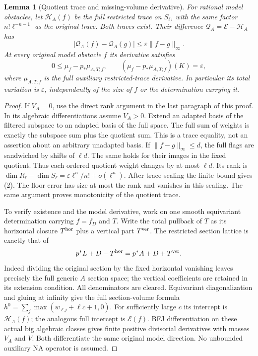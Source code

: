 \documentclass[11pt]{article}
\newtheorem{lemma}[theorem]{Lemma}
\begin{document}
\begin{lemma}[Quotient trace and missing-volume derivative]\label{quotient}
For rational model obstacles, let $\mathscr H_A(f)$ be the
full restricted trace on $S_\ell$, with the same factor
$n!\ell^{-n-1}$ as the original trace.
Both traces exist. Their difference
$\mathscr Q_A=\mathscr E-\mathscr H_A$ has
\[
 |\mathscr Q_A(f)-\mathscr Q_A(g)|
              \leq\varepsilon\|f-g\|_\infty.            \tag{2}
\]
At every original model obstacle $f$ its derivative satisfies
\[
 0\leq\mu_f-p_*\mu_{A,T;f},\qquad
 (\mu_f-p_*\mu_{A,T;f})(K)=\varepsilon,                 \tag{3}
\]
where $\mu_{A,T;f}$ is the full auxiliary restricted-trace derivative.
In particular its total variation is $\varepsilon$, independently
of the size of $f$ or the determination carrying it.
\end{lemma}
\begin{proof}
If $V_A=0$, use the direct rank argument in the last paragraph
of this proof. In its algebraic differentiations assume $V_A>0$.
Extend an adapted basis of the filtered subspace to an adapted
basis of the full space. The full sum of weights is exactly the
subspace sum plus the quotient sum. This is a trace equality, not
an assertion about an arbitrary unadapted basis.
If $\|f-g\|_\infty\leq d$, the full flags are sandwiched by shifts
of $\ell d$. The same holds for their images in the fixed quotient.
Thus each ordered quotient weight changes by at most $\ell d$.
Its rank is
$\dim R_\ell-\dim S_\ell=
\varepsilon\ell^n/n!+o(\ell^n)$.
After trace scaling the finite bound gives (2).
The floor error has size at most the rank and vanishes in this
scaling. The same argument proves monotonicity of the quotient trace.

To verify existence and the model derivative, work on one smooth
equivariant determination carrying $f=f_D$ and $T$.
Write the total pullback of $T$ as its horizontal closure $T^{\rm hor}$
plus a vertical part $T^{\rm ver}$.
The restricted section lattice is exactly that of
\[
 p^*L+D-T^{\rm hor}
          =p^*A+D+T^{\rm ver}.
\]
Indeed dividing the original section by the fixed horizontal
vanishing leaves precisely the full generic $A$ section space;
the vertical coefficients are retained in its extension condition.
All denominators are cleared. Equivariant diagonalization and
gluing at infinity give the full section-volume formula
$h^0=\sum_j\max(w_{\ell j}+\ell c+1,0)$.
For sufficiently large $c$ its intercept is $\mathscr H_A(f)$;
the analogous full intercept is $\mathscr E(f)$.
BFJ differentiation on these actual big algebraic classes gives
finite positive divisorial derivatives with masses $V_A$ and $V$.
Both differentiate the same original model direction.
No unbounded auxiliary NA operator is assumed.


\end{proof}
\end{document}
